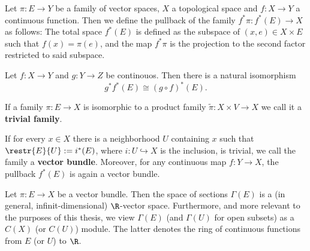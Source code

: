 \begin{definition} \label{def:vb-pullbackOfAFamilyOfVectorSpaces}
	Let $\pi:E\to Y$ be a family of vector spaces, $X$ a topological space and $f:X\to Y  $ a continuous function. Then we define the pullback of the family $f^*{\pi}:f^*(E) \to X$ as follows: 
	The total space $f^*(E)$ is defined as the subspace of $(x,e)\in X\times E$ such that $f(x)=\pi(e)$, and the map $f^*{\pi}$ is the projection to the second factor restricted to said subspace.
\end{definition}
\begin{corollary} \label{cor:vb-pullbackIsFunctoriell}
	Let $f: X\to Y$ and  $g:Y\to Z$ be continouos. Then there is a natural isomorphism $$g^*f^*(E)\cong (g\circ f)^*(E).$$ 
\end{corollary}
\begin{definition}\label{def:vb-trivialBundle}
	If a family $\pi: E \to X$ is isomorphic to a product family $\tilde{\pi}:X\times V\to X$ we call it a \textbf{trivial family}.
\end{definition}
\begin{definition}\label{def:vb-vectorBundle}
	If for every $x\in X$ there is a neighborhood $U$ containing $x$ such that $\restr{E}{U}:=i^*(E)$, where $i:U\hookrightarrow X$ is the inclusion, is trivial, we call the family a \textbf{vector bundle}. Moreover, for any continuous map $f:Y\to X$, the pullback $f^*(E)$ is again a vector bundle.  
\end{definition}
\begin{remark}
	Let $\pi:E\to X$ be a vector bundle. Then the space of sections $\Gamma(E)$ is a (in general, infinit-dimensional) $\R$-vector space. Furthermore, and more relevant to the purposes of this thesis, we view $\Gamma(E)$ (and $\Gamma(U)$ for open subsets) as a $C(X)$ (or $C(U)$) module.  The latter denotes the ring of continuous functions from $E$ (or $U$) to $\R$. 
\end{remark}

